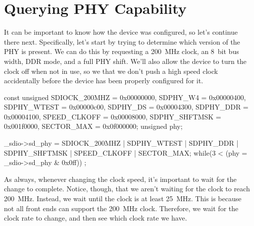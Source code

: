 \documentclass{gqtekspec}
\begin{document}
\section{Querying PHY Capability}
It can be important to know how the device was configured, so let's continue
there next.  Specifically, let's start by trying to determine which version of
the PHY is present.  We can do this by requesting a 200~MHz clock, an 8~bit
bus width, DDR mode, and a full PHY shift.  We'll also allow the device to
turn the clock off when not in use, so we that we don't push a high
speed clock accidentally before the device has been properly configured
for it.

\begin{zCpp}
	const	unsigned	SDIOCK_200MHZ = 0x00000000,
				SDPHY_W4      = 0x00000400,
				SDPHY_WTEST   = 0x00000c00,
				SDPHY_DS      = 0x00004300,
				SDPHY_DDR     = 0x00004100,
				SPEED_CLKOFF  = 0x00008000,
				SDPHY_SHFTMSK = 0x001f0000,
				SECTOR_MAX    = 0x0f000000;
	unsigned	phy;

	_sdio->sd_phy = SDIOCK_200MHZ | SDPHY_WTEST | SDPHY_DDR
			| SDPHY_SHFTMSK | SPEED_CLKOFF | SECTOR_MAX;
	while(3 < (phy = _sdio->sd_phy & 0x0ff))
		;
\end{zCpp}

As always, whenever changing the clock speed, it's important to wait for
the change to complete.  Notice, though, that we aren't waiting for the
clock to reach 200~MHz.  Instead, we wait until the clock is at least 25~MHz.
This is because not all front ends can support the 200~MHz clock.  Therefore,
we wait for the clock rate to change, and then see which clock rate we have.
\end{document}
